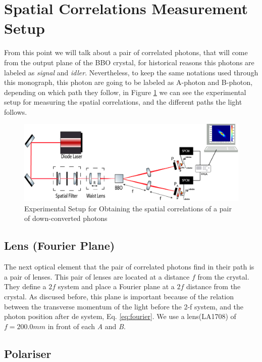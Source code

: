 \section{Spatial Correlations Measurement Setup}
From this point we will talk about a pair of correlated photons, that will come from the output plane of the BBO 
crystal, for historical reasons this photons are labeled as \textit{signal} and \textit{idler}. Nevertheless, to keep the same notations used through 
this monograph, this photon are going to be labeled as A-photon and B-photon, depending on which path they follow, in Figure \ref{fig:spatialSetup}
we can see the experimental setup for measuring the spatial correlations, and the different paths the light follows.

\begin{figure}[h!]
\centering
\includegraphics[width=1\textwidth]{Figures/spatialCorrelationSetup.png}
\caption{Experimental Setup for Obtaining the spatial correlations of a pair of down-converted photons} 
\label{fig:spatialSetup}
\end{figure}

\subsection{Lens (Fourier Plane)}
The next optical element that the pair of correlated photons find in their path is a pair of lenses. This pair of lenses are located at a
distance $f$ from the crystal. They define a $2f$ system and place a Fourier plane at a $2f$ distance from the crystal. As discused before, 
this plane is important because of the relation between the transverse momentum of the light before the 2-f system, and the photon 
position after de system, Eq. \ref{eq:fourier}. We use a lens(LA1708) of $f=200.0mm$ in front of each \textit{A} and \textit{B}. 


\subsection{Polariser}

